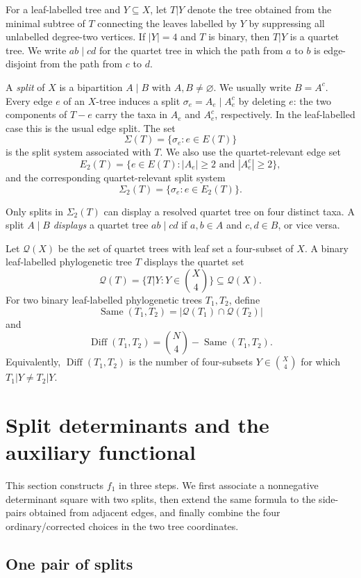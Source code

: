 \documentclass[11pt]{article}
\newcommand{\Same}{\operatorname{Same}}
\newcommand{\Diff}{\operatorname{Diff}}
\newcommand{\calQ}{\mathcal Q}
\begin{document}
For a leaf-labelled tree and $Y\subseteq X$, let $T|Y$ denote the tree obtained from the minimal subtree of $T$ connecting the leaves labelled by $Y$ by suppressing all unlabelled degree-two vertices.  If $|Y|=4$ and $T$ is binary, then $T|Y$ is a quartet tree.  We write $ab\mid cd$ for the quartet tree in which the path from $a$ to $b$ is edge-disjoint from the path from $c$ to $d$.

A \emph{split} of $X$ is a bipartition $A\mid B$ with $A,B\ne\varnothing$.  We usually write $B=A^c$.  Every edge $e$ of an $X$-tree induces a split $\sigma_e=A_e\mid A_e^c$ by deleting $e$: the two components of $T-e$ carry the taxa in $A_e$ and $A_e^c$, respectively.  In the leaf-labelled case this is the usual edge split.  The set
\[
\Sigma(T)=\{\sigma_e:e\in E(T)\}
\]
is the split system associated with $T$.  We also use the quartet-relevant edge set
\[
E_2(T)=\{e\in E(T): |A_e|\ge 2 \text{ and } |A_e^c|\ge 2\},
\]
and the corresponding quartet-relevant split system
\[
\Sigma_2(T)=\{\sigma_e:e\in E_2(T)\}.
\]

Only splits in $\Sigma_2(T)$ can display a resolved quartet tree on four distinct taxa.  A split $A\mid B$ \emph{displays} a quartet tree $ab\mid cd$ if $a,b\in A$ and $c,d\in B$, or vice versa.

Let $\calQ(X)$ be the set of quartet trees with leaf set a four-subset of $X$.  A binary leaf-labelled phylogenetic tree $T$ displays the quartet set
\[
\calQ(T)=\{T|Y:Y\in \binom X4\}\subseteq \calQ(X).
\]
For two binary leaf-labelled phylogenetic trees $T_1,T_2$, define
\[
\Same(T_1,T_2)=|\calQ(T_1)\cap \calQ(T_2)|
\]
and
\[
\Diff(T_1,T_2)=\binom N4-\Same(T_1,T_2).
\]
Equivalently, $\Diff(T_1,T_2)$ is the number of four-subsets $Y\in\binom X4$ for which $T_1|Y\ne T_2|Y$.

\section{Split determinants and the auxiliary functional}

This section constructs $f_1$ in three steps.  We first associate a
nonnegative determinant square with two splits, then extend the same formula
to the side-pairs obtained from adjacent edges, and finally combine the four
ordinary/corrected choices in the two tree coordinates.

\subsection{One pair of splits}
\end{document}
